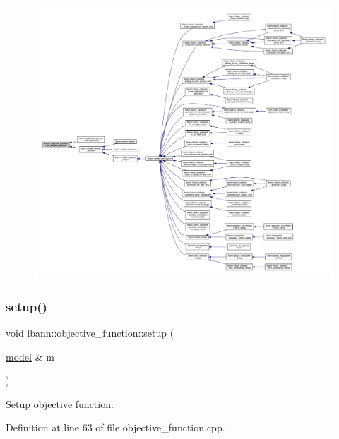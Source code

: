 \begin{figure}[H]
\begin{center}
\leavevmode
\includegraphics[width=350pt]{classlbann_1_1objective__function_a9c3211354ca1cee8a7ba219f4e56e03c_icgraph}
\end{center}
\end{figure}
\mbox{\label{classlbann_1_1objective__function_ac14bb274978e0a5182122fd179579878}} 
\subsubsection{\texorpdfstring{setup()}{setup()}}
{\footnotesize\ttfamily void lbann\+::objective\+\_\+function\+::setup (\begin{DoxyParamCaption}\item[{\hyperlink{classlbann_1_1model}{model} \&}]{m }\end{DoxyParamCaption})}

Setup objective function. 

Definition at line 63 of file objective\+\_\+function.\+cpp.


